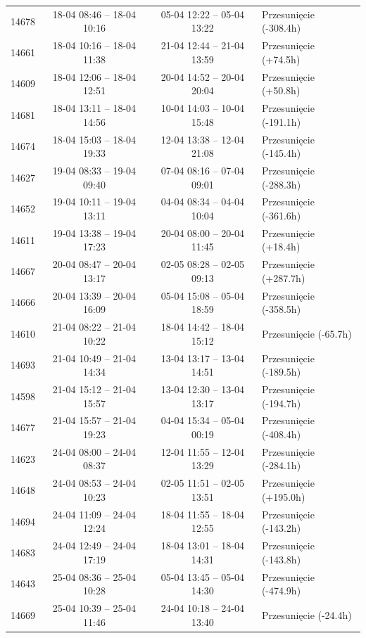 \begin{table}[htbp]
\begin{tabular}{|r|c|c|l|}
14678 & 18-04 08:46 -- 18-04 10:16 & 05-04 12:22 -- 05-04 13:22 & Przesunięcie (-308.4h) \\ 
14661 & 18-04 10:16 -- 18-04 11:38 & 21-04 12:44 -- 21-04 13:59 & Przesunięcie (+74.5h) \\ 
14609 & 18-04 12:06 -- 18-04 12:51 & 20-04 14:52 -- 20-04 20:04 & Przesunięcie (+50.8h) \\ 
14681 & 18-04 13:11 -- 18-04 14:56 & 10-04 14:03 -- 10-04 15:48 & Przesunięcie (-191.1h) \\ 
14674 & 18-04 15:03 -- 18-04 19:33 & 12-04 13:38 -- 12-04 21:08 & Przesunięcie (-145.4h) \\ 
14627 & 19-04 08:33 -- 19-04 09:40 & 07-04 08:16 -- 07-04 09:01 & Przesunięcie (-288.3h) \\ 
14652 & 19-04 10:11 -- 19-04 13:11 & 04-04 08:34 -- 04-04 10:04 & Przesunięcie (-361.6h) \\ 
14611 & 19-04 13:38 -- 19-04 17:23 & 20-04 08:00 -- 20-04 11:45 & Przesunięcie (+18.4h) \\ 
14667 & 20-04 08:47 -- 20-04 13:17 & 02-05 08:28 -- 02-05 09:13 & Przesunięcie (+287.7h) \\ 
14666 & 20-04 13:39 -- 20-04 16:09 & 05-04 15:08 -- 05-04 18:59 & Przesunięcie (-358.5h) \\ 
14610 & 21-04 08:22 -- 21-04 10:22 & 18-04 14:42 -- 18-04 15:12 & Przesunięcie (-65.7h) \\ 
14693 & 21-04 10:49 -- 21-04 14:34 & 13-04 13:17 -- 13-04 14:51 & Przesunięcie (-189.5h) \\ 
14598 & 21-04 15:12 -- 21-04 15:57 & 13-04 12:30 -- 13-04 13:17 & Przesunięcie (-194.7h) \\ 
14677 & 21-04 15:57 -- 21-04 19:23 & 04-04 15:34 -- 05-04 00:19 & Przesunięcie (-408.4h) \\ 
14623 & 24-04 08:00 -- 24-04 08:37 & 12-04 11:55 -- 12-04 13:29 & Przesunięcie (-284.1h) \\ 
14648 & 24-04 08:53 -- 24-04 10:23 & 02-05 11:51 -- 02-05 13:51 & Przesunięcie (+195.0h) \\ 
14694 & 24-04 11:09 -- 24-04 12:24 & 18-04 11:55 -- 18-04 12:55 & Przesunięcie (-143.2h) \\ 
14683 & 24-04 12:49 -- 24-04 17:19 & 18-04 13:01 -- 18-04 14:31 & Przesunięcie (-143.8h) \\ 
14643 & 25-04 08:36 -- 25-04 10:28 & 05-04 13:45 -- 05-04 14:30 & Przesunięcie (-474.9h) \\ 
14669 & 25-04 10:39 -- 25-04 11:46 & 24-04 10:18 -- 24-04 13:40 & Przesunięcie (-24.4h) \\ 

\end{tabular}
\end{table}
